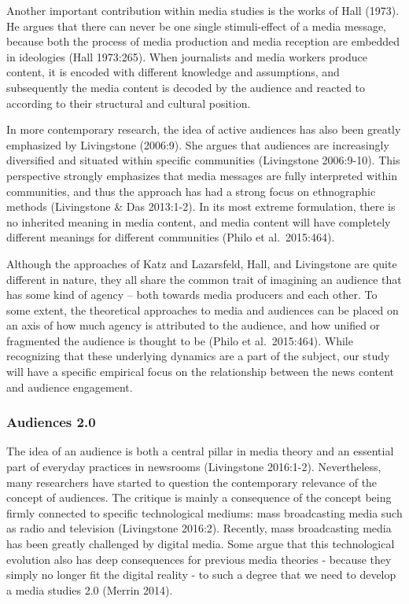 \documentclass[
]{article}
\begin{document}
Another important contribution within media studies is the works of Hall
(1973). He argues that there can never be one single stimuli-effect of a
media message, because both the process of media production and media
reception are embedded in ideologies (Hall 1973:265). When journalists
and media workers produce content, it is encoded with different
knowledge and assumptions, and subsequently the media content is decoded
by the audience and reacted to according to their structural and
cultural position.

In more contemporary research, the idea of active audiences has also
been greatly emphasized by Livingstone (2006:9). She argues that
audiences are increasingly diversified and situated within specific
communities (Livingstone 2006:9-10). This perspective strongly
emphasizes that media messages are fully interpreted within communities,
and thus the approach has had a strong focus on ethnographic methods
(Livingstone \& Das 2013:1-2). In its most extreme formulation, there is
no inherited meaning in media content, and media content will have
completely different meanings for different communities (Philo et
al.~2015:464).

Although the approaches of Katz and Lazarsfeld, Hall, and Livingstone
are quite different in nature, they all share the common trait of
imagining an audience that has some kind of agency -- both towards media
producers and each other. To some extent, the theoretical approaches to
media and audiences can be placed on an axis of how much agency is
attributed to the audience, and how unified or fragmented the audience
is thought to be (Philo et al.~2015:464). While recognizing that these
underlying dynamics are a part of the subject, our study will have a
specific empirical focus on the relationship between the news content
and audience engagement.

\hypertarget{audiences-2.0}{%
\subsubsection{Audiences 2.0}\label{audiences-2.0}}

\noindent The idea of an audience is both a central pillar in media
theory and an essential part of everyday practices in newsrooms
(Livingstone 2016:1-2). Nevertheless, many researchers have started to
question the contemporary relevance of the concept of audiences. The
critique is mainly a consequence of the concept being firmly connected
to specific technological mediums: mass broadcasting media such as radio
and television (Livingstone 2016:2). Recently, mass broadcasting media
has been greatly challenged by digital media. Some argue that this
technological evolution also has deep consequences for previous media
theories - because they simply no longer fit the digital reality - to
such a degree that we need to develop a media studies 2.0 (Merrin 2014).
\end{document}
